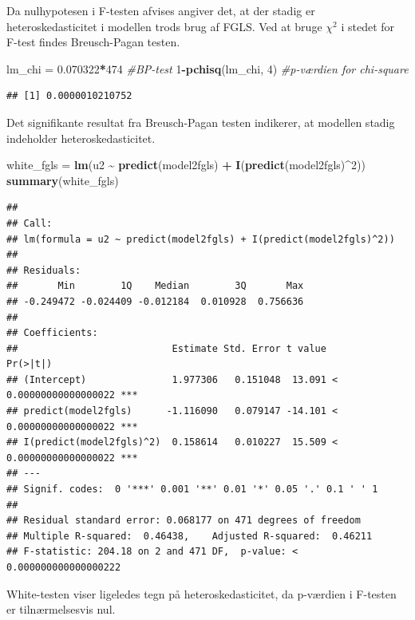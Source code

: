 \documentclass[
]{article}
\newenvironment{Shaded}{\begin{snugshade}}{\end{snugshade}}
\newcommand{\CommentTok}[1]{\textcolor[rgb]{0.56,0.35,0.01}{\textit{#1}}}
\newcommand{\DecValTok}[1]{\textcolor[rgb]{0.00,0.00,0.81}{#1}}
\newcommand{\FloatTok}[1]{\textcolor[rgb]{0.00,0.00,0.81}{#1}}
\newcommand{\FunctionTok}[1]{\textcolor[rgb]{0.13,0.29,0.53}{\textbf{#1}}}
\newcommand{\NormalTok}[1]{#1}
\newcommand{\OtherTok}[1]{\textcolor[rgb]{0.56,0.35,0.01}{#1}}
\newcommand{\SpecialCharTok}[1]{\textcolor[rgb]{0.81,0.36,0.00}{\textbf{#1}}}
\begin{document}
Da nulhypotesen i F-testen afvises angiver det, at der stadig er
heteroskedasticitet i modellen trods brug af FGLS. Ved at bruge
\(\chi^2\) i stedet for F-test findes Breusch-Pagan testen.

\begin{Shaded}
\begin{Highlighting}[]
\NormalTok{lm\_chi }\OtherTok{=} \FloatTok{0.070322}\SpecialCharTok{*}\DecValTok{474} \CommentTok{\#BP{-}test}
\DecValTok{1}\SpecialCharTok{{-}}\FunctionTok{pchisq}\NormalTok{(lm\_chi, }\DecValTok{4}\NormalTok{) }\CommentTok{\#p{-}værdien for chi{-}square}
\end{Highlighting}
\end{Shaded}

\begin{verbatim}
## [1] 0.0000010210752
\end{verbatim}

Det signifikante resultat fra Breusch-Pagan testen indikerer, at
modellen stadig indeholder heteroskedasticitet.

\begin{Shaded}
\begin{Highlighting}[]
\NormalTok{white\_fgls }\OtherTok{=} \FunctionTok{lm}\NormalTok{(u2 }\SpecialCharTok{\textasciitilde{}} \FunctionTok{predict}\NormalTok{(model2fgls) }\SpecialCharTok{+} \FunctionTok{I}\NormalTok{(}\FunctionTok{predict}\NormalTok{(model2fgls)}\SpecialCharTok{\^{}}\DecValTok{2}\NormalTok{))}
\FunctionTok{summary}\NormalTok{(white\_fgls)}
\end{Highlighting}
\end{Shaded}

\begin{verbatim}
## 
## Call:
## lm(formula = u2 ~ predict(model2fgls) + I(predict(model2fgls)^2))
## 
## Residuals:
##       Min        1Q    Median        3Q       Max 
## -0.249472 -0.024409 -0.012184  0.010928  0.756636 
## 
## Coefficients:
##                           Estimate Std. Error t value              Pr(>|t|)    
## (Intercept)               1.977306   0.151048  13.091 < 0.00000000000000022 ***
## predict(model2fgls)      -1.116090   0.079147 -14.101 < 0.00000000000000022 ***
## I(predict(model2fgls)^2)  0.158614   0.010227  15.509 < 0.00000000000000022 ***
## ---
## Signif. codes:  0 '***' 0.001 '**' 0.01 '*' 0.05 '.' 0.1 ' ' 1
## 
## Residual standard error: 0.068177 on 471 degrees of freedom
## Multiple R-squared:  0.46438,    Adjusted R-squared:  0.46211 
## F-statistic: 204.18 on 2 and 471 DF,  p-value: < 0.000000000000000222
\end{verbatim}

White-testen viser ligeledes tegn på heteroskedasticitet, da p-værdien i
F-testen er tilnærmelsesvis nul.
\end{document}
